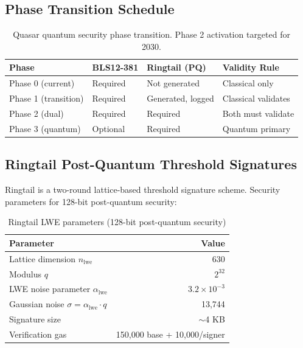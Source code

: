 \documentclass[11pt]{article}
\begin{document}
\subsection{Phase Transition Schedule}

\begin{table}[h]
\centering
\begin{tabular}{llll}
\toprule
\textbf{Phase} & \textbf{BLS12-381} & \textbf{Ringtail (PQ)} & \textbf{Validity Rule} \\
\midrule
Phase 0 (current) & Required & Not generated & Classical only \\
Phase 1 (transition) & Required & Generated, logged & Classical validates \\
Phase 2 (dual) & Required & Required & Both must validate \\
Phase 3 (quantum) & Optional & Required & Quantum primary \\
\bottomrule
\end{tabular}
\caption{Quasar quantum security phase transition. Phase 2 activation targeted for 2030.}
\label{tab:quasar-phases}
\end{table}

\subsection{Ringtail Post-Quantum Threshold Signatures}

Ringtail \cite{ntt-ringtail} is a two-round lattice-based threshold signature scheme. Security parameters for 128-bit post-quantum security:

\begin{table}[h]
\centering
\begin{tabular}{lr}
\toprule
\textbf{Parameter} & \textbf{Value} \\
\midrule
Lattice dimension $n_{\text{lwe}}$ & 630 \\
Modulus $q$ & $2^{32}$ \\
LWE noise parameter $\alpha_{\text{lwe}}$ & $3.2 \times 10^{-3}$ \\
Gaussian noise $\sigma = \alpha_{\text{lwe}} \cdot q$ & 13,744 \\
Signature size & $\sim$4 KB \\
Verification gas & 150,000 base + 10,000/signer \\
\bottomrule
\end{tabular}
\caption{Ringtail LWE parameters (128-bit post-quantum security)}
\end{table}
\end{document}
